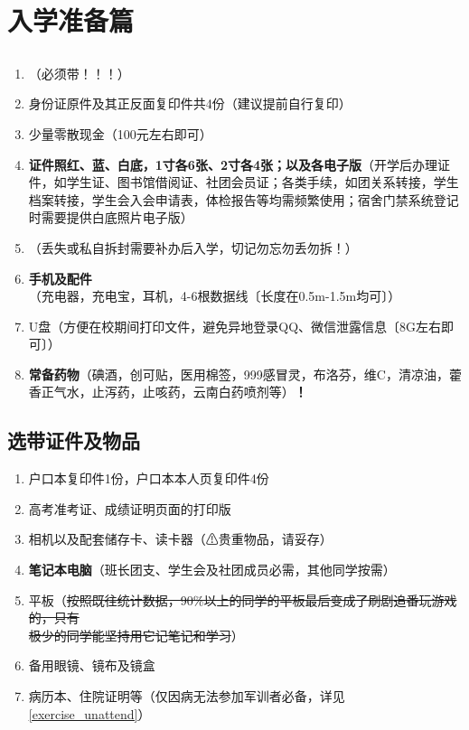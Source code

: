 \chapter[入学准备篇]{入学准备篇}

\section[必要证件及物品]{}
\begin{enumerate}
    \item \textbf{}（必须带！！！）
    \item 身份证原件及其正反面复印件共4份（建议提前自行复印）
    \item 少量零散现金（100元左右即可）\footnotemark
    \item \textbf{证件照红、蓝、白底，1寸各6张、2寸各4张；以及各电子版}（开学后办理证件，如学生证、图书馆借阅证、社团会员证；各类手续，如团关系转接，学生档案转接，学生会入会申请表，体检报告等均需频繁使用；宿舍门禁系统登记时需要提供白底照片电子版）
    \item \textbf{}（丢失或私自拆封需要补办后入学，切记勿忘勿丢勿拆！）
    \item \textbf{手机及配件}（充电器，充电宝，耳机，4-6根数据线〔长度在0.5m-1.5m均可〕）
    \item U盘（方便在校期间打印文件，避免异地登录QQ、微信泄露信息〔8G左右即可〕）
    \item \textbf{常备药物}（碘酒，创可贴，医用棉签，999感冒灵，布洛芬，维C，清凉油，藿香正气水，止泻药，止咳药，云南白药喷剂等）\textbf{！}
\end{enumerate}

\section[选带证件及物品]{选带证件及物品}
\begin{enumerate}
    \item 户口本复印件1份，户口本本人页复印件4份\footnotemark
    \item 高考准考证、成绩证明页面的打印版\footnotemark
    \item 相机以及配套储存卡、读卡器（⚠贵重物品，请妥存）
    \item \textbf{笔记本电脑}（班长团支、学生会及社团成员必需，其他同学按需）
    \item 平板（\sout{按照既往统计数据，90\%以上的同学的平板最后变成了刷剧追番玩游戏的，只有\\极少的同学能坚持用它记笔记和学习}）
    \item 备用眼镜、镜布及镜盒
    \item 病历本、住院证明等（仅因病无法参加军训者必备，详见\uline{\ref{exercise_unattend}}）
\end{enumerate}

